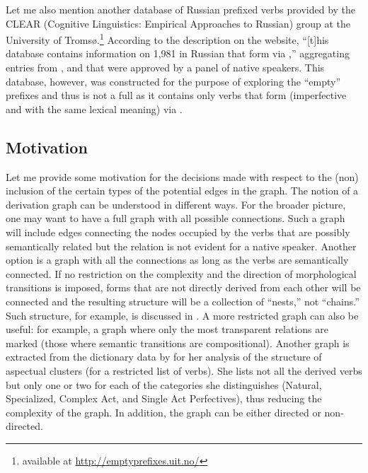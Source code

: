 Let me also mention another database of Russian prefixed verbs provided by the CLEAR (Cognitive Linguistics: Empirical Approaches to Russian) group at the University
of Troms{\o}.\footnote{available at \url{http://emptyprefixes.uit.no/}} According to the description on the website, ``[t]his database contains information on 1,981  in Russian that form  via ,'' aggregating entries from \citet{MAS,  Ozegov:01},  and \citet{Cubberly:82} that were approved by a panel of native speakers. This database, however, was constructed for the purpose of exploring the ``empty'' prefixes and thus is not a full  as it contains only verbs that form  (imperfective and  with the same lexical meaning) via .

\subsection{Motivation}\label{section:chains:motivation}
Let me provide some motivation for the decisions made with respect to the (non) inclusion of the certain types of the potential edges in the graph. The notion of a derivation graph can be understood in different ways. For the broader picture, one may want to have a full graph with all possible connections. Such a graph will include edges connecting the nodes occupied by the verbs that are possibly semantically related but the relation is not evident for a native speaker. Another option is a graph with all the connections as long as the verbs are semantically connected. If no restriction on the complexity and the direction of morphological transitions is imposed, forms that are not directly derived from each other will be connected and the resulting structure will be a collection of ``nests,'' not ``chains.'' Such structure, for example, is discussed in \citealt{Janda:10}. A more restricted graph can also be useful: for example, a graph where only the most transparent relations are marked (those where semantic transitions are compositional). Another graph is extracted from the dictionary data by \citet{Janda:07a} for her analysis of the structure of aspectual clusters (for a restricted list of verbs). She lists not all the derived verbs but only one or two for each of the categories she distinguishes (Natural, Specialized, Complex Act, and Single Act Perfectives), thus reducing the complexity of the graph. In addition, the graph can be either directed or non-directed. 
 
